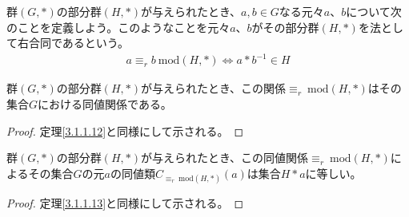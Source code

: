 \documentclass[dvipdfmx]{jsarticle}
\begin{document}
\begin{dfn}
群$(G,*)$の部分群$(H,*)$が与えられたとき、$a,b \in G$なる元々$a$、$b$について次のことを定義しよう。このようなことを元々$a$、$b$がその部分群$(H,*)$を法として右合同であるという。
\begin{align*}
a \equiv_{r}b\ \mathrm{mod}(H,*) \Leftrightarrow a*b^{- 1} \in H
\end{align*}
\end{dfn}
\begin{thm}\label{3.1.1.16}
群$(G,*)$の部分群$(H,*)$が与えられたとき、この関係$\equiv_{r}\ \mathrm{mod}(H,*)$はその集合$G$における同値関係である。
\end{thm}
\begin{proof} 定理\ref{3.1.1.12}と同様にして示される。
\end{proof}
\begin{thm}\label{3.1.1.17}
群$(G,*)$の部分群$(H,*)$が与えられたとき、この同値関係$\equiv_{r}\ \mathrm{mod}(H,*)$によるその集合$G$の元$a$の同値類$C_{\equiv_{r}\ \mathrm{mod}(H,*)}(a)$は集合$H*a$に等しい。
\end{thm}
\begin{proof} 定理\ref{3.1.1.13}と同様にして示される。
\end{proof}
\end{document}
